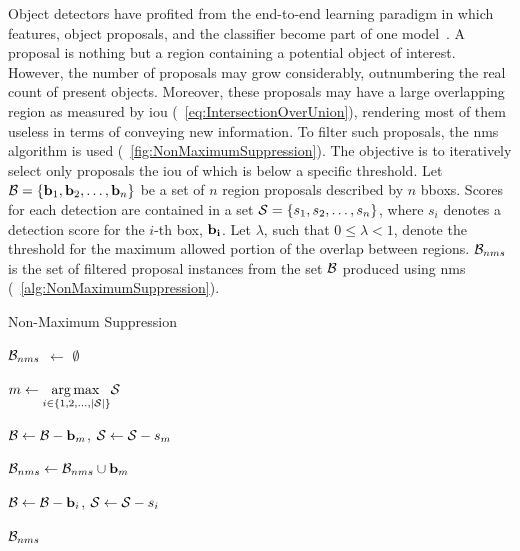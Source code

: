Object detectors have profited from the end-to-end learning paradigm in which features, object proposals, and the classifier become part of one model~\cite{hosang2017learningnms}. A proposal is nothing but a region containing a potential object of interest. However, the number of proposals may grow considerably, outnumbering the real count of present objects. Moreover, these proposals may have a large overlapping region as measured by \gls{iou} (\sectiontext{}~\ref{eq:IntersectionOverUnion}), rendering most of them useless in terms of conveying new information. To filter such proposals, the \gls{nms} algorithm is used (\figtext{}~\ref{fig:NonMaximumSuppression}). The objective is to iteratively select only proposals the \gls{iou} of which is below a specific threshold. Let $\mathcal{B} = \left\{ {\mathbf{b}_1, \mathbf{b}_2, \dots, \mathbf{b}_n} \right\}$ be a set of $n$ region proposals described by $n$ \glspl{bbox}. Scores for each detection are contained in a set $\mathcal{S} = \left\{ {s_1, s_2, \dots, s_n} \right\}$, where $s_i$ denotes a detection score for the $i$-th box, $\mathbf{b_i}$. Let $\lambda$, such that $0 \leq \lambda < 1$, denote the threshold for the maximum allowed portion of the overlap between regions. $\mathcal{B}_{nms}$ is the set of filtered proposal instances from the set $\mathcal{B}$ produced using \gls{nms} (\algtext{}~\ref{alg:NonMaximumSuppression}).

\begin{algorithm}[t]
    \caption{Non-Maximum Suppression}
    \label{alg:NonMaximumSuppression}
    \begin{algorithmic}[1]

        \State $\mathcal{B}_{nms}$ $\gets$ $\emptyset$


        \State $m \gets \underset{i \in \left\{ {1, 2, \dots, \left\vert \mathcal{S} \right\vert} \right\}}{\operatorname*{arg\,max}{}} \mathcal{S}$

        \State $\mathcal{B} \gets \mathcal{B} - \mathbf{b}_m$, $\mathcal{S} \gets \mathcal{S} - s_m$

        \State $\mathcal{B}_{nms} \gets \mathcal{B}_{nms} \cup \mathbf{b}_m$



        \State $\mathcal{B} \gets \mathcal{B} - \mathbf{b}_i$, $\mathcal{S} \gets \mathcal{S} - s_i$
        \EndIf
        \EndFor
        \EndWhile

        \State \Return $\mathcal{B}_{nms}$
        \EndFunction
    \end{algorithmic}
\end{algorithm}


